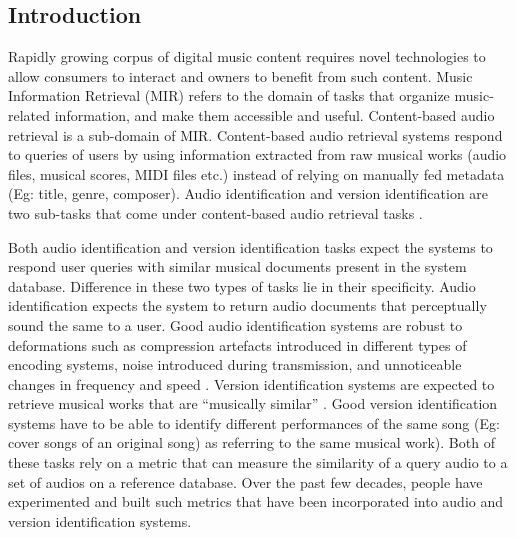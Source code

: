 \documentclass[../main.tex]{subfiles}
\begin{document}
\subsection{Introduction}

\par
Rapidly growing corpus of digital music content requires novel technologies to allow consumers to interact and owners to benefit from such content. Music Information Retrieval (\gls{MIR}) refers to the domain of tasks that organize music-related information, and make them accessible and useful. Content-based audio retrieval is a sub-domain of \gls{MIR}. Content-based audio retrieval systems respond to queries of users by using information extracted from raw musical works (audio files, musical scores, \gls{MIDI} files etc.) instead of relying on manually fed metadata (Eg: title, genre, composer). Audio identification and version identification are two sub-tasks that come under content-based audio retrieval tasks \cite{book}.

\par
Both audio identification and version identification tasks expect the systems to respond user queries with similar musical documents present in the system database. Difference in these two types of tasks lie in their specificity. Audio identification expects the system to return audio documents that perceptually sound the same to a user. Good audio identification systems are robust to deformations such as compression artefacts introduced in different types of encoding systems, noise introduced during transmission, and unnoticeable changes in frequency and speed \cite{book}. Version identification systems are expected to retrieve musical works that are “musically similar” \cite{serraAudioCoverSong2010}. Good version identification systems have to be able to identify different performances of the same song (Eg: cover songs of an original song) as referring to the same musical work). Both of these tasks rely on a metric that can measure the similarity of a query audio to a set of audios on a reference database. Over the past few decades, people have experimented and built such metrics that have been incorporated into audio and version identification systems.
\end{document}
